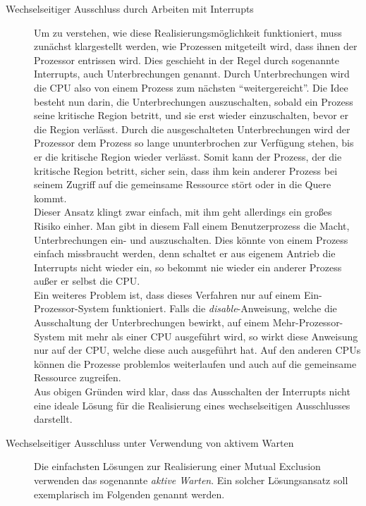 				\begin{description}
					\item[Wechselseitiger Ausschluss durch Arbeiten mit Interrupts]
					
							Um zu verstehen, wie diese Realisierungsmöglichkeit funktioniert, muss zunächst klargestellt werden, wie Prozessen mitgeteilt wird, dass ihnen der Prozessor entrissen wird. Dies geschieht in der Regel durch sogenannte Interrupts, auch Unterbrechungen genannt. Durch Unterbrechungen wird die CPU also von einem Prozess zum nächsten "`weitergereicht"'. Die Idee besteht nun darin, die Unterbrechungen auszuschalten, sobald ein Prozess seine kritische Region betritt, und sie erst wieder einzuschalten, bevor er die Region verlässt. Durch die ausgeschalteten Unterbrechungen wird der Prozessor dem Prozess so lange ununterbrochen zur Verfügung stehen, bis er die kritische Region wieder verlässt. Somit kann der Prozess, der die kritische Region betritt, sicher sein, dass ihm kein anderer Prozess bei seinem Zugriff auf die gemeinsame Ressource stört oder in die Quere kommt.\\
							Dieser Ansatz klingt zwar einfach, mit ihm geht allerdings ein großes Risiko einher. Man gibt in diesem Fall einem Benutzerprozess die Macht, Unterbrechungen ein- und auszuschalten. Dies könnte von einem Prozess einfach missbraucht werden, denn schaltet er aus eigenem Antrieb die Interrupts nicht wieder ein, so bekommt nie wieder ein anderer Prozess außer er selbst die CPU.\\
							Ein weiteres Problem ist, dass dieses Verfahren nur auf einem Ein-Prozessor-System funktioniert. Falls die \textit{disable}-Anweisung, welche die Ausschaltung der Unterbrechungen bewirkt, auf einem Mehr-Prozessor-System mit mehr als einer CPU ausgeführt wird, so wirkt diese Anweisung nur auf der CPU, welche diese auch ausgeführt hat. Auf den anderen CPUs können die Prozesse problemlos weiterlaufen und auch auf die gemeinsame Ressource zugreifen.\\
							Aus obigen Gründen wird klar, dass das Ausschalten der Interrupts nicht eine ideale Lösung für die Realisierung eines wechselseitigen Ausschlusses darstellt. \cite{ModerneBetriebssysteme}
							
					\item[Wechselseitiger Ausschluss unter Verwendung von aktivem Warten]
					
						Die einfachsten Lösungen zur Realisierung einer Mutual Exclusion verwenden das sogenannte \textit{aktive Warten}. Ein solcher Lösungsansatz soll exemplarisch im Folgenden genannt werden.
					

\end{description}
